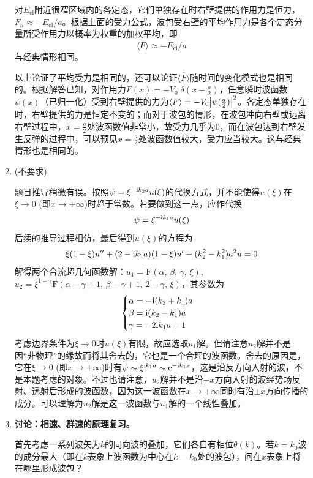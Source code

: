 \begin{enumerate}[label=\textbf{4.\arabic*}, listparindent=\parindent, leftmargin=-0.5mm]
对$E_\mathrm{cl}$附近很窄区域内的各定态，它们单独存在时右壁提供的作用力是恒力，$F_n \approx -E_\mathrm{cl}/a$。根据上面的受力公式，波包受右壁的平均作用力是各个定态分量所受作用力以概率为权重的加权平均，即
\[\overline{\langle F\rangle} \approx -E_\mathrm{cl}/a\]
与经典情形相同。

以上论证了平均受力是相同的，还可以论证$\overline{\langle F\rangle}$随时间的变化模式也是相同的。根据解答已知，对作用力$F(x) = -V_0\;\delta(x-\frac{a}{2})$，任意瞬时波函数$\psi(x)$（已归一化）受到右壁提供的力为$\langle F\rangle = -V_0\abs{\psi(\frac{a}{2})}^2$。各定态单独存在时，右壁提供的力是恒定不变的；而对于波包的情形，在波包冲向右壁或远离右壁过程中，$x=\frac{a}{2}$处波函数值非常小，故受力几乎为0，而在波包达到右壁发生反弹的过程中，可以预见$x=\frac{a}{2}$处波函数值较大，受力应当较大。这与经典情形也是相同的。

\setcounter{enumi}{11}
\item (不要求)

题目推导稍微有误。按照$\psi = \xi^{-\mathrm{i} k_2 a}u(\xi)$的代换方式，并不能使得$u(\xi)$在$\xi\rightarrow 0$ (即$x\rightarrow+\infty$)时趋于常数。若要做到这一点，应作代换
\[\psi = \xi^{-\mathrm{i} k_1 a}u(\xi)\]
后续的推导过程相仿，最后得到$u(\xi)$的方程为
\[\xi(1-\xi)u''+(2-\mathrm{i} k_1 a)(1-\xi)u'-(k_2^2-k_1^2)a^2 u =0\]
解得两个合流超几何函数解：$u_1 = \mathrm{F}(\alpha,\,\beta,\,\gamma,\,\xi)$, $u_2 = \xi^{1-\gamma}\mathrm{F}(\alpha-\gamma+1,\,\beta-\gamma+1,\,2-\gamma,\,\xi)$，其参数为
\[\begin{cases}
\alpha = -\mathrm{i}(k_2+k_1)a\\
\beta = \mathrm{i}(k_2-k_1)a\\
\gamma = -2\mathrm{i} k_1 a+1
\end{cases}\]
考虑边界条件为$\xi\rightarrow 0$时$u(\xi)$有限，故应选取$u_1$解。但请注意$u_2$解并不是因“非物理”的缘故而将其舍去的，它也是一个合理的波函数。舍去的原因是，它在$\xi\rightarrow 0$ (即$x\rightarrow+\infty$)时有$\psi\sim \xi^{\mathrm{i} k_1 a}\sim \mathrm{e}^{-\mathrm{i} k_1 x}$，这是沿反方向入射的波，不是本题考虑的对象。不过也请注意，$u_2$解并不是沿$-x$方向入射的波经势场反射、透射后形成的波函数，因为这一波函数在$x\rightarrow +\infty$同时有沿$\pm x$方向传播的成分。可以理解为$u_2$解是这一波函数与$u_1$解的一个线性叠加。

\setcounter{enumi}{12}
\item
\noindent\textbf{\color{red}讨论：相速、群速的原理复习。}

首先考虑一系列波矢为$k$的同向波的叠加，它们各自有相位$\theta(k)$。若$k=k_0$波的成分最大（即在$k$表象上波函数为中心在$k=k_0$处的波包），问在$x$表象上将在哪里形成波包？


\end{enumerate}
